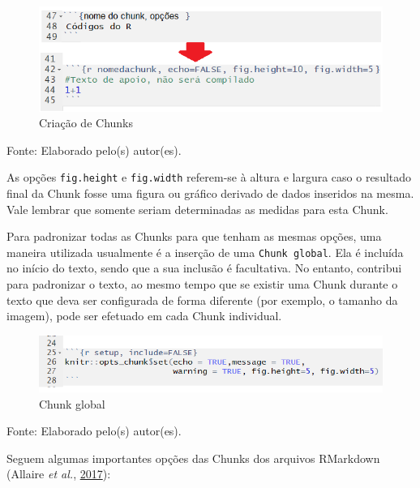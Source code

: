 \documentclass[12pt,brazil,oneside]{book}
\begin{document}
\begin{figure}[H]

{\centering \includegraphics[width=0.7\linewidth]{rmarkchunk2} 

}

\caption{Criação de Chunks}\label{fig:rmarkchunk2}
\end{figure}

Fonte: Elaborado pelo(s) autor(es).

As opções \texttt{fig.height} e \texttt{fig.width} referem-se à altura e largura caso o resultado final da Chunk fosse uma figura ou gráfico derivado de dados inseridos na mesma. Vale lembrar que somente seriam determinadas as medidas para esta Chunk.

Para padronizar todas as Chunks para que tenham as mesmas opções, uma maneira utilizada usualmente é a inserção de uma \texttt{Chunk\ global}. Ela é incluída no início do texto, sendo que a sua inclusão é facultativa. No entanto, contribui para padronizar o texto, ao mesmo tempo que se existir uma Chunk durante o texto que deva ser configurada de forma diferente (por exemplo, o tamanho da imagem), pode ser efetuado em cada Chunk individual.

\begin{figure}[H]

{\centering \includegraphics[width=0.7\linewidth]{rmarkchunkopt} 

}

\caption{Chunk global}\label{fig:rmarkchunkopt}
\end{figure}

Fonte: Elaborado pelo(s) autor(es).

Seguem algumas importantes opções das Chunks dos arquivos RMarkdown (Allaire \emph{et al.}, \protect\hyperlink{ref-R-rmarkdown}{2017}):
\end{document}
